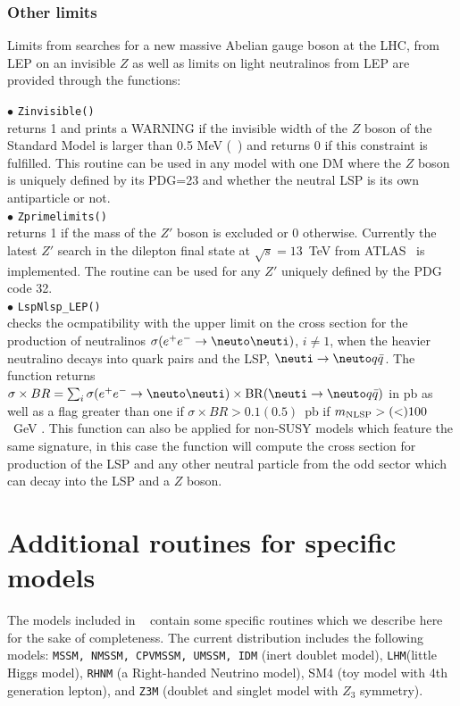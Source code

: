 \documentclass[12pt,a4paper]{article}
\begin{document}
{\subsubsection{Other limits}

Limits from searches for a new massive Abelian gauge boson at the LHC, from LEP on an invisible $Z$ as well as limits on light neutralinos from LEP are provided through the functions: 


\noi$\bullet$ \verb|Zinvisible()|\\
returns 1 and prints a WARNING if the invisible width of the $Z$ boson of the Standard Model 
is larger than 0.5 MeV (~\cite{Freitas:2014hra}) and returns 0 if this constraint is fulfilled.
This routine can be used in any model with one DM where the $Z$ boson is  uniquely defined by its PDG=23 and whether the neutral LSP is its own antiparticle or not.\\

\noi$\bullet$ \verb|Zprimelimits()|\\
returns 1 if the mass of the $Z'$ boson is excluded or 0 otherwise. 
Currently the latest $Z'$ search in the dilepton final state at $\sqrt{s} = 13$~TeV from ATLAS~\cite{ATLASZprime} is implemented.  
 The routine can be used for any $Z'$ uniquely defined by the PDG code 32. \\


\noi$\bullet$   \verb|LspNlsp_LEP()|\\
checks  the ocmpatibility with the upper limit \cite{Abbiendi:2003sc} on the cross section for the production of neutralinos 
$\sigma(e^+e^-\rightarrow \neuto\neuti)$, $i\neq 1$, when the heavier neutralino decays into quark pairs 
and the LSP, $\neuti \rightarrow \neuto q\bar{q}$. The function  
 returns $\sigma \times BR = \sum_i \sigma(e^+e^-\rightarrow \neuto\neuti)\times {\rm BR}(\neuti \rightarrow \neuto q\bar{q})$ in pb as well as a flag greater than one if $\sigma \times BR>0.1(0.5)$~pb if $m_{\rm NLSP}> (<)100$~GeV \cite{Abbiendi:2003sc}. 
This function can also be applied for non-SUSY models which feature the same signature, in this case the function will compute the cross section for production of the LSP and any other neutral particle from the odd sector which can decay into the LSP and a $Z$ boson.





\section{Additional routines for specific models}
The models included in \micro~ contain some specific routines
which we describe here for the sake of completeness. The current 
distribution includes the following models: {\tt MSSM, NMSSM, CPVMSSM, UMSSM, IDM}  (inert doublet model), {\tt LHM}(little Higgs model),
{\tt RHNM} (a Right-handed Neutrino model), SM4 (toy model with 4th generation lepton), and {\tt Z3M} (doublet and singlet model with $Z_3$ symmetry). 

}
\end{document}
